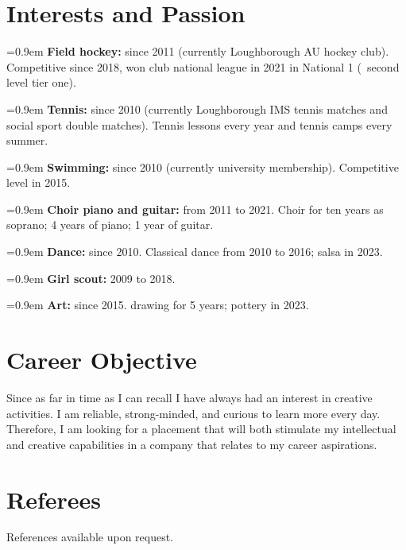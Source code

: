 \documentclass[10pt,a4paper]{article}
\newcommand{\cvitem}[2]{%
  \hangindent=0.9em\hangafter=1
  \textbf{#1} #2\par
}
\begin{document}
\section{Interests and Passion}
\cvitem{Field hockey:}{since 2011 (currently Loughborough AU hockey club). Competitive since 2018, won club national league in 2021 in National 1 (~second level tier one).}
\cvitem{Tennis:}{since 2010 (currently Loughborough IMS tennis matches and social sport double matches). Tennis lessons every year and tennis camps every summer.}
\cvitem{Swimming:}{since 2010 (currently university membership). Competitive level in 2015.}
\cvitem{Choir piano and guitar:}{from 2011 to 2021. Choir for ten years as soprano; 4 years of piano; 1 year of guitar.}
\cvitem{Dance:}{since 2010. Classical dance from 2010 to 2016; salsa in 2023.}
\cvitem{Girl scout:}{2009 to 2018.}
\cvitem{Art:}{since 2015. drawing for 5 years; pottery in 2023.}

\section{Career Objective}
Since as far in time as I can recall I have always had an interest in creative activities. I am reliable, strong-minded, and curious to learn more every day. Therefore, I am looking for a placement that will both stimulate my intellectual and creative capabilities in a company that relates to my career aspirations.

\section{Referees}
References available upon request.
\end{document}
